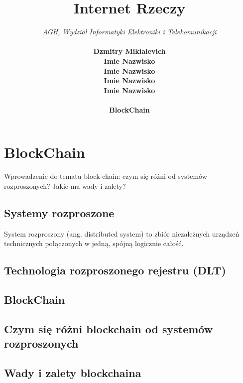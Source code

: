 \documentclass[12pt]{article}
\begin{document}
\title{Internet Rzeczy}
\author{
  \textit{AGH, Wydzial Informatyki Elektroniki i Telekomunikacji} \\ \\
  \textbf{Dzmitry Mikialevich}\\
  \textbf{Imie Nazwisko}\\
  \textbf{Imie Nazwisko}\\
  \textbf{Imie Nazwisko}\\
  \textbf{Imie Nazwisko}\\ \\
  \textbf{BlockChain}
}
\date{ }
\maketitle
\tableofcontents

\newpage

\section{BlockChain}

Wprowadzenie do tematu block-chain: czym się różni od systemów rozproszonych? Jakie ma wady i zalety?

\subsection{Systemy rozproszone}
System rozproszony (ang. distributed system) to zbiór niezależnych urządzeń technicznych połączonych w jedną, spójną logicznie całość.\cite{wiki-sr} \\

\subsection{Technologia rozproszonego rejestru (DLT)}
\subsection{BlockChain}

\subsection{Czym się różni blockchain od systemów rozproszonych}

\subsection{Wady i zalety blockchaina}
\end{document}
